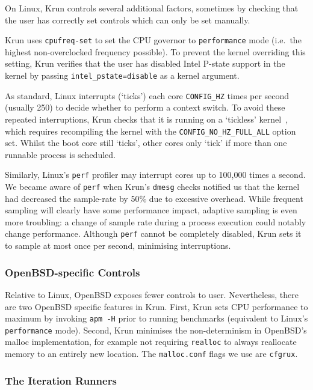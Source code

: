 \documentclass[acmsmall]{acmart}\settopmatter{printfolios=true}
\newcommand{\krun}{Krun\xspace}
\begin{document}
On Linux, \krun controls several additional factors, sometimes by checking that
the user has correctly set controls which can only be set manually.

\krun uses \texttt{cpufreq-set} to set the CPU governor to \texttt{performance} mode
(i.e.~the highest non-overclocked frequency possible).
To prevent the kernel overriding this setting, \krun verifies that the user has disabled
Intel P-state support in the kernel by passing
\texttt{intel\_pstate=disable} as a kernel argument.

As standard, Linux interrupts (`ticks') each core
\texttt{CONFIG\-\_HZ} times per second (usually 250) to
decide whether to perform a context switch. To avoid these repeated
interruptions, \krun checks that it is running on a `tickless'
kernel~\cite{tickless}, which requires recompiling the kernel with the
\texttt{CONFIG\_NO\_HZ\_FULL\_ALL} option set. Whilst the boot core still
`ticks', other cores only `tick' if more than one runnable process is scheduled.

Similarly, Linux's \texttt{perf} profiler may interrupt cores up to 100,000 times a
second. We became aware of \texttt{perf} when \krun's \texttt{dmesg} checks
notified us that the kernel had decreased the sample-rate by
50\% due to excessive overhead. While frequent sampling will clearly have some performance
impact, adaptive sampling is even more troubling: a change of sample
rate during a process execution could notably change performance.
Although \texttt{perf} cannot be completely disabled, \krun sets it to sample at most
once per second, minimising interruptions.


\subsubsection{OpenBSD-specific Controls}

Relative to Linux, OpenBSD exposes fewer controls to user. Nevertheless,
there are two OpenBSD specific features in \krun.
First, \krun sets CPU performance to maximum by invoking \texttt{apm -H} prior
to running benchmarks (equivalent to Linux's \texttt{performance} mode).
Second, \krun minimises the non-determinism in OpenBSD's malloc implementation,
for example not requiring \texttt{realloc} to always reallocate memory to
an entirely new location. The \texttt{malloc.conf} flags we use are \texttt{cfgrux}.


\subsubsection{The Iteration Runners}
\end{document}
